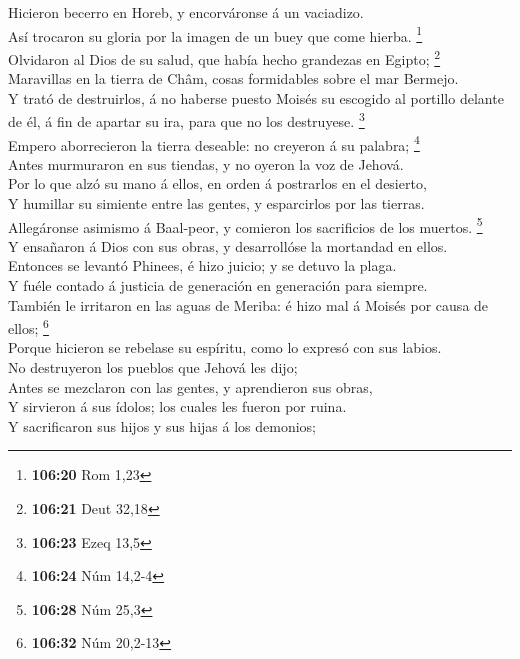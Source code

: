  Hicieron becerro en Horeb, y encorváronse á un
vaciadizo.\\
 Así trocaron su gloria por la imagen de un buey que come
hierba. \footnote{\textbf{106:20} Rom 1,23}\\
 Olvidaron al Dios de su salud, que había hecho grandezas
en Egipto; \footnote{\textbf{106:21} Deut 32,18}\\
 Maravillas en la tierra de Châm, cosas formidables sobre
el mar Bermejo.\\
 Y trató de destruirlos, á no haberse puesto Moisés su
escogido al portillo delante de él, á fin de apartar su ira, para que no
los destruyese. \footnote{\textbf{106:23} Ezeq 13,5}\\
 Empero aborrecieron la tierra deseable: no creyeron á su
palabra; \footnote{\textbf{106:24} Núm 14,2-4}\\
 Antes murmuraron en sus tiendas, y no oyeron la voz de
Jehová.\\
 Por lo que alzó su mano á ellos, en orden á postrarlos
en el desierto,\\
 Y humillar su simiente entre las gentes, y esparcirlos
por las tierras.\\
 Allegáronse asimismo á Baal-peor, y comieron los
sacrificios de los muertos. \footnote{\textbf{106:28} Núm 25,3}\\
 Y ensañaron á Dios con sus obras, y desarrollóse la
mortandad en ellos.\\
 Entonces se levantó Phinees, é hizo juicio; y se detuvo
la plaga.\\
 Y fuéle contado á justicia de generación en generación
para siempre.\\
 También le irritaron en las aguas de Meriba: é hizo mal
á Moisés por causa de ellos; \footnote{\textbf{106:32} Núm 20,2-13}\\
 Porque hicieron se rebelase su espíritu, como lo expresó
con sus labios.\\
 No destruyeron los pueblos que Jehová les dijo;\\
 Antes se mezclaron con las gentes, y aprendieron sus
obras,\\
 Y sirvieron á sus ídolos; los cuales les fueron por
ruina.\\
 Y sacrificaron sus hijos y sus hijas á los demonios;
